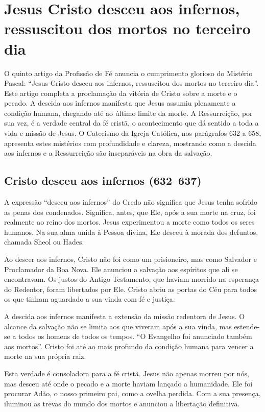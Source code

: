 \chapter{Jesus Cristo desceu aos infernos, ressuscitou dos mortos no terceiro dia}

O quinto artigo da Profissão de Fé anuncia o cumprimento glorioso do Mistério Pascal: ``Jesus Cristo desceu aos infernos, ressuscitou dos mortos no terceiro dia''. Este artigo completa a proclamação da vitória de Cristo sobre a morte e o pecado. A descida aos infernos manifesta que Jesus assumiu plenamente a condição humana, chegando até ao último limite da morte. A Ressurreição, por sua vez, é a verdade central da fé cristã, o acontecimento que dá sentido a toda a vida e missão de Jesus. O Catecismo da Igreja Católica, nos parágrafos 632 a 658, apresenta estes mistérios com profundidade e clareza, mostrando como a descida aos infernos e a Ressurreição são inseparáveis na obra da salvação.

\section{Cristo desceu aos infernos (632--637)}

A expressão ``desceu aos infernos'' do Credo não significa que Jesus tenha sofrido as penas dos condenados. Significa, antes, que Ele, após a sua morte na cruz, foi realmente ao reino dos mortos. Jesus experimentou a morte como todos os seres humanos. Na sua alma unida à Pessoa divina, Ele desceu à morada dos defuntos, chamada Sheol ou Hades.

Ao descer aos infernos, Cristo não foi como um prisioneiro, mas como Salvador e Proclamador da Boa Nova. Ele anunciou a salvação aos espíritos que ali se encontravam. Os justos do Antigo Testamento, que haviam morrido na esperança do Redentor, foram libertados por Ele. Cristo abriu as portas do Céu para todos os que tinham aguardado a sua vinda com fé e justiça.

A descida aos infernos manifesta a extensão da missão redentora de Jesus. O alcance da salvação não se limita aos que viveram após a sua vinda, mas estende-se a todos os homens de todos os tempos. ``O Evangelho foi anunciado também aos mortos''. Cristo foi até ao mais profundo da condição humana para vencer a morte na sua própria raiz.

Esta verdade é consoladora para a fé cristã. Jesus não apenas morreu por nós, mas desceu até onde o pecado e a morte haviam lançado a humanidade. Ele foi procurar Adão, o nosso primeiro pai, como a ovelha perdida. Com a sua presença, iluminou as trevas do mundo dos mortos e anunciou a libertação definitiva.

